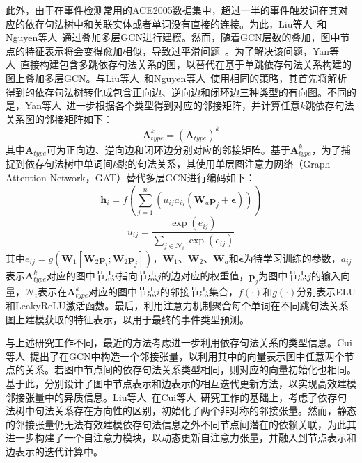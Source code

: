此外，由于在事件检测常用的ACE2005数据集中，超过一半的事件触发词在其对应的依存句法树中和关联实体或者单词没有直接的连接。为此，Liu等人~\cite{liu2018jointly}和Nguyen等人~\cite{nguyen2018graph}通过叠加多层GCN进行建模。然而，随着GCN层数的叠加，图中节点的特征表示将会变得愈加相似，导致过平滑问题~\cite{zhou2020graph}。为了解决该问题，Yan等人~\cite{yan2019event}直接构建包含多跳依存句法关系的图，以替代在基于单跳依存句法关系构建的图上叠加多层GCN。与Liu等人~\cite{liu2018jointly}和Nguyen等人~\cite{nguyen2018graph}使用相同的策略，其首先将解析得到的依存句法树转化成包含正向边、逆向边和闭环边三种类型的有向图。不同的是，Yan等人~\cite{yan2019event}进一步根据各个类型得到对应的邻接矩阵，并计算任意$k$跳依存句法关系图的邻接矩阵如下：
\begin{equation}
    \boldsymbol{A}_{ type}^k=\left(\boldsymbol{A}_{type}\right)^k
\end{equation}
其中$\boldsymbol{A}_{type}$可为正向边、逆向边和闭环边分别对应的邻接矩阵。基于$\boldsymbol{A}_{ type}^k$，为了捕捉到依存句法树中单词间$k$跳的句法关系，其使用单层图注意力网络（Graph Attention Network，GAT）\cite{velivckovic2017graph}替代多层GCN进行编码如下：
\begin{equation}
    \boldsymbol{h}_i=f( \sum_{j=1}^n\left(u_{i j} a_{i j}\left(\boldsymbol{W}_{a} \boldsymbol{p}_j+\boldsymbol{\epsilon}\right)\right))
\end{equation}
\begin{equation}
    u_{i j}=\frac{\exp \left(e_{i j}\right)}{\sum_{j \in \mathcal{N}_i} \exp \left(e_{i j}\right)}
\end{equation}
其中$e_{i j}=g\left(\boldsymbol{W}_1\left[\boldsymbol{W}_2 \boldsymbol{p}_i;\boldsymbol{W}_2 \boldsymbol{p}_j\right]\right)$，$\boldsymbol{W}_1$、$\boldsymbol{W}_2$、$\boldsymbol{W}_{a}$和$\boldsymbol{\epsilon}$为待学习训练的参数，$a_{i j}$表示$\boldsymbol{A}_{ type}^k$对应的图中节点$i$指向节点$j$的边对应的权重值，$\boldsymbol{p}_j$为图中节点$j$的输入向量，$\mathcal{N}_i$表示在$\boldsymbol{A}_{ type}^k$对应的图中节点$i$的邻接节点集合，$f(\cdot)$和$g(\cdot)$分别表示ELU和LeakyReLU激活函数。最后，利用注意力机制聚合每个单词在不同跳句法关系图上建模获取的特征表示，以用于最终的事件类型预测。

与上述研究工作不同，最近的方法考虑进一步利用依存句法关系的类型信息。Cui等人~\cite{cui2020edge}提出了在GCN中构造一个邻接张量，以利用其中的向量表示图中任意两个节点的关系。若图中节点间的依存句法关系类型相同，则对应的向量初始化也相同。基于此，分别设计了图中节点表示和边表示的相互迭代更新方法，以实现高效建模邻接张量中的异质信息。Liu等人~\cite{liu2021self}在Cui等人~\cite{cui2020edge}研究工作的基础上，考虑了依存句法树中句法关系存在方向性的区别，初始化了两个非对称的邻接张量。然而，静态的邻接张量仍无法有效建模依存句法信息之外不同节点间潜在的依赖关联，为此其进一步构建了一个自注意力模块，以动态更新自注意力张量，并融入到节点表示和边表示的迭代计算中。

